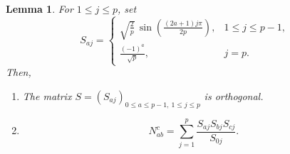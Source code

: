 \documentclass[11pt]{amsart}
\newtheorem{lemma}[theorem]{Lemma}
\begin{document}
\begin{lemma}\label{lm: trig}
For \(1\leq j\leq p\), set
\[
S_{aj}=
\begin{cases}
\sqrt{\frac{2}{p}}\,
\sin\!\left(\frac{(2a+1)j\pi}{2p}\right),
& 1\leq j\leq p-1,\\[6pt]
\frac{(-1)^a}{\sqrt p},
& j=p.
\end{cases}
\]
Then,
\begin{enumerate}
    \item[(a)] The matrix $S=(S_{aj})_{0\leq a\leq p-1,\ 1\leq j\leq p}$
is orthogonal.
\item[(b)] \begin{equation}\label{eq: finite-verlinde}
    N_{ab}^{c}
    =
    \sum_{j=1}^{p}
    \frac{S_{aj}S_{bj}S_{cj}}{S_{0j}}.
\end{equation}
\end{enumerate}

\end{lemma}
\end{document}

